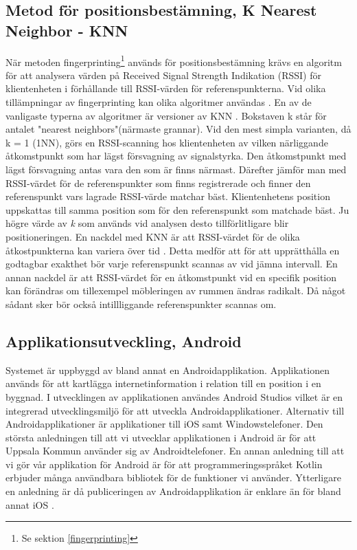 \documentclass[swedish, a4paper,12pt]{article}
\begin{document}
\subsection{Metod för positionsbestämning, K Nearest Neighbor - KNN}\label{KNN}
När metoden fingerprinting\footnote{Se sektion \ref{fingerprinting}} används för positionsbestämning krävs en algoritm för att analysera värden på Received Signal Strength Indikation (RSSI) för klientenheten i förhållande till RSSI-värden för referenspunkterna. Vid olika tillämpningar av fingerprinting kan olika algoritmer användas \cite{tian2013fingerprint}\cite{jun2018low}. En av de vanligaste typerna av algoritmer är versioner av KNN \cite{tian2013fingerprint}.
Bokstaven k står för antalet "nearest neighbors"(närmaste grannar). Vid den mest simpla varianten, då k = 1 (1NN), görs en RSSI-scanning hos klientenheten av vilken närliggande åtkomstpunkt som har lägst försvagning av signalstyrka. Den åtkomstpunkt med lägst försvagning antas vara den som är finns närmast. Därefter jämför man med RSSI-värdet för de referenspunkter som finns registrerade och finner den referenspunkt vars lagrade RSSI-värde matchar bäst. Klientenhetens position uppskattas till samma position som för den referenspunkt som matchade bäst.
Ju högre värde av \textit{k} som används vid analysen desto tillförlitligare blir positioneringen\cite{yiu2017wireless}.
En nackdel med KNN är att RSSI-värdet för de olika åtkostpunkterna kan variera över tid \cite{tian2013fingerprint}. Detta medför att för att upprätthålla en godtagbar exakthet bör varje referenspunkt scannas av vid jämna intervall.
En annan nackdel är att RSSI-värdet för en åtkomstpunkt vid en specifik position kan förändras om tillexempel möbleringen av rummen ändras radikalt\cite{zanca2008experimental}. Då något sådant sker bör också intillliggande referenspunkter scannas om.

\subsection{Applikationsutveckling, Android}
Systemet är uppbyggd av bland annat en Androidapplikation. Applikationen används för att kartlägga internetinformation i relation till en position i en byggnad. I utvecklingen av applikationen användes Android Studios vilket är en integrerad utvecklingsmiljö för att utveckla Androidapplikationer. Alternativ till Androidapplikationer är applikationer till iOS samt Windowstelefoner. Den största anledningen till att vi utvecklar applikationen i Android är för att Uppsala Kommun använder sig av Androidtelefoner. En annan anledning till att vi gör vår applikation för Android är för att programmeringsspråket Kotlin erbjuder många användbara bibliotek för de funktioner vi använder. Ytterligare en anledning är då publiceringen av Androidapplikation är enklare än för bland annat iOS \cite{submitIphone}\cite{android}.
\end{document}
